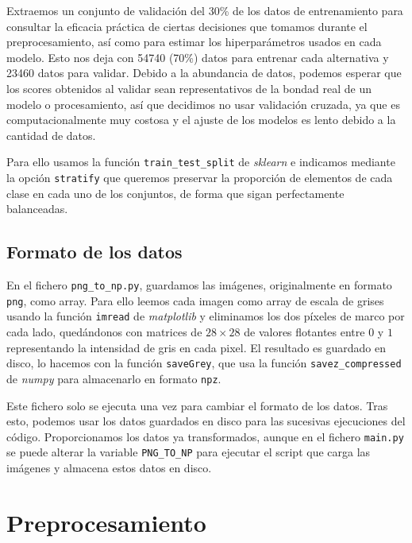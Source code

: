 \documentclass[a4]{article}
\begin{document}
Extraemos un conjunto de validación del 30\% de los datos de
entrenamiento para consultar la eficacia práctica de ciertas
decisiones que tomamos durante el preprocesamiento, así como para
estimar los hiperparámetros usados en cada modelo. Esto nos deja con
54740 (70\%) datos para entrenar cada alternativa y 23460 datos para
validar. Debido a la abundancia de datos, podemos esperar que los
scores obtenidos al validar sean representativos de la bondad real de
un modelo o procesamiento, así que decidimos no usar validación
cruzada, ya que es computacionalmente muy costosa y el ajuste de los
modelos es lento debido a la cantidad de datos.

Para ello usamos la función \texttt{train\_test\_split} de
\textit{sklearn} e indicamos mediante la opción \texttt{stratify} que
queremos preservar la proporción de elementos de cada clase en cada
uno de los conjuntos, de forma que sigan perfectamente balanceadas.

\subsection{Formato de los datos}

En el fichero \texttt{png\_to\_np.py}, guardamos las imágenes,
originalmente en formato \texttt{png}, como array. Para ello leemos
cada imagen como array de escala de grises usando la función
\texttt{imread} de \textit{matplotlib} y eliminamos los dos píxeles de
marco por cada lado, quedándonos con matrices de $28 \times 28$ de
valores flotantes entre $0$ y $1$ representando la intensidad de gris
en cada pixel. El resultado es guardado en disco, lo hacemos con la
función \texttt{saveGrey}, que usa la función
\texttt{savez\_compressed} de \textit{numpy} para almacenarlo en
formato \texttt{npz}.

Este fichero solo se ejecuta una vez para cambiar el formato de los
datos. Tras esto, podemos usar los datos guardados en disco para las
sucesivas ejecuciones del código. Proporcionamos los datos ya
transformados, aunque en el fichero \texttt{main.py} se puede alterar
la variable \texttt{PNG\_TO\_NP} para ejecutar el script que carga las
imágenes y almacena estos datos en disco.

\section{Preprocesamiento}

\end{document}
